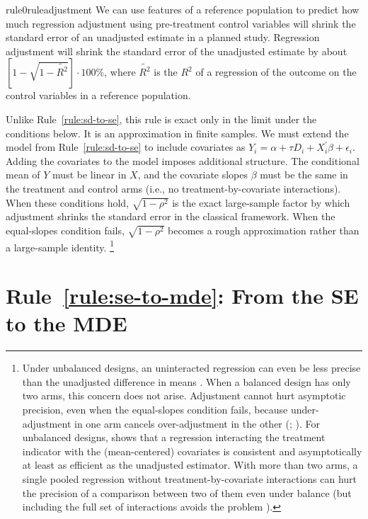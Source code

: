 \documentclass[12pt]{article}
\begin{document}
\begin{restatable}[Adjustment]{rule0}{ruleadjustment}
\label{rule:adjustment}
We can use features of a reference population to predict how much regression adjustment using pre-treatment control variables will shrink the standard error of an unadjusted estimate in a planned study. Regression adjustment will shrink the standard error of the unadjusted estimate by about $\left\lbrack 1 - \sqrt{1 - \widetilde{R^{2}}} \right\rbrack \cdot 100\%$, where $\widetilde{R^2}$ is the $R^2$ of a regression of the outcome on the control variables in a reference population.
\end{restatable}

\noindent Unlike Rule~\ref{rule:sd-to-se}, this rule is exact only in the limit under the conditions below. It is an approximation in finite samples.
We must extend the model from Rule~\ref{rule:sd-to-se} to include covariates as $Y_{i} = \alpha + \tau D_{i} + X_{i}^{\prime}\beta + \epsilon_{i}$.
Adding the covariates to the model imposes additional structure. 
The conditional mean of $Y$ must be linear in $X$, and the covariate slopes $\beta$ must be the same in the treatment and control arms (i.e., no treatment-by-covariate interactions).
When these conditions hold, $\sqrt{1 - \rho^{2}}$ is the exact large-sample factor by which adjustment shrinks the standard error in the classical framework.
When the equal-slopes condition fails, $\sqrt{1 - \rho^{2}}$ becomes a rough approximation rather than a large-sample identity.%
\footnote{
  Under unbalanced designs, an uninteracted regression can even be less precise than the unadjusted difference in means \citep{Freedman2008}. 
  When a balanced design has only two arms, this concern does not arise. Adjustment cannot hurt asymptotic precision, even when the equal-slopes condition fails, because under-adjustment in one arm cancels over-adjustment in the other (\citealp[189]{Freedman2008}; \citealp[302--303]{Lin2013}). 
  For unbalanced designs, \citet{Lin2013} shows that a regression interacting the treatment indicator with the (mean-centered) covariates is consistent and asymptotically at least as efficient as the unadjusted estimator. With more than two arms, a single pooled regression without treatment-by-covariate interactions can hurt the precision of a comparison between two of them even under balance (but including the full set of interactions avoids the problem \citep[303--304]{Lin2013}).
  }

\section*{Rule~\ref{rule:se-to-mde}: From the SE to the MDE}
\end{document}

